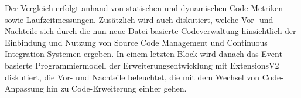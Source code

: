 Der Vergleich erfolgt anhand von statischen und dynamischen Code-Metriken sowie Laufzeitmessungen. Zusätzlich wird auch diskutiert, welche Vor- und Nachteile sich durch die nun neue Datei-basierte Codeverwaltung hinsichtlich der Einbindung und Nutzung von Source Code Management und Continuous Integration Systemen ergeben. In einem letzten Block wird danach das Event-basierte Programmiermodell der Erweiterungsentwicklung mit ExtensionsV2 diskutiert, die Vor- und Nachteile beleuchtet, die mit dem Wechsel von Code-Anpassung hin zu Code-Erweiterung einher gehen.

